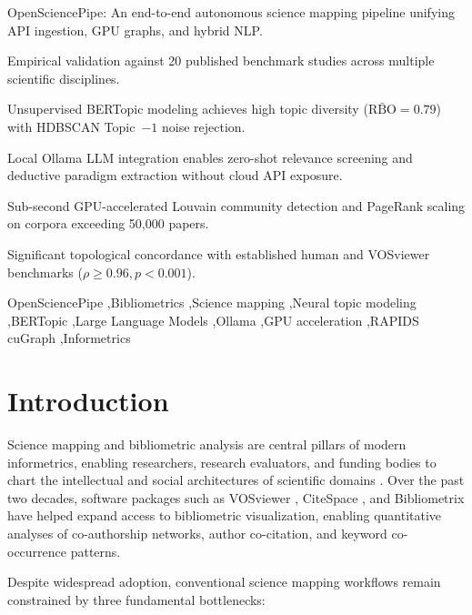 \documentclass[preprint,12pt]{elsarticle}
\begin{document}
\begin{frontmatter}
\begin{highlights}
\item OpenSciencePipe: An end-to-end autonomous science mapping pipeline unifying API ingestion, GPU graphs, and hybrid NLP.
\item Empirical validation against 20 published benchmark studies across multiple scientific disciplines.
\item Unsupervised BERTopic modeling achieves high topic diversity ($\bar{\text{RBO}} = 0.79$) with HDBSCAN Topic~$-1$ noise rejection.
\item Local Ollama LLM integration enables zero-shot relevance screening and deductive paradigm extraction without cloud API exposure.
\item Sub-second GPU-accelerated Louvain community detection and PageRank scaling on corpora exceeding 50,000 papers.
\item Significant topological concordance with established human and VOSviewer benchmarks ($\rho \ge 0.96, p < 0.001$).
\end{highlights}

\begin{keyword}
OpenSciencePipe \sep Bibliometrics \sep Science mapping \sep Neural topic modeling \sep BERTopic \sep Large Language Models \sep Ollama \sep GPU acceleration \sep RAPIDS cuGraph \sep Informetrics
\end{keyword}

\end{frontmatter}

\section{Introduction}
\label{sec:intro}
Science mapping and bibliometric analysis are central pillars of modern informetrics, enabling researchers, research evaluators, and funding bodies to chart the intellectual and social architectures of scientific domains \cite{van2010software, chen2006citespace, cobo2011science}. Over the past two decades, software packages such as VOSviewer \cite{van2010software}, CiteSpace \cite{chen2006citespace}, and Bibliometrix \cite{aria2017bibliometrix} have helped expand access to bibliometric visualization, enabling quantitative analyses of co-authorship networks, author co-citation, and keyword co-occurrence patterns.

Despite widespread adoption, conventional science mapping workflows remain constrained by three fundamental bottlenecks:
\end{document}
